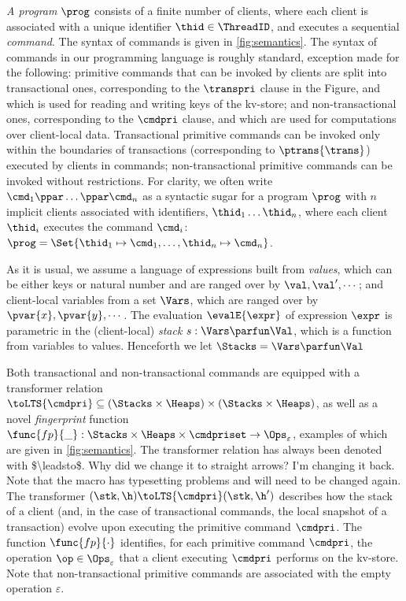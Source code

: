 \emph{A program} \( \prog \) consists of a finite number of clients, where each client is associated with a unique identifier \( \thid \in \ThreadID \), and executes a sequential \emph{command}. The syntax of commands is given in \cref{fig:semantics}. 
The syntax of commands in our programming language is roughly standard, exception made for the following: 
primitive commands that can be invoked by clients are split into transactional ones, corresponding to the $\transpri$ clause in the Figure, and which is used for reading 
and writing keys of the kv-store; and non-transactional ones, corresponding to the $\cmdpri$ clause, and which are used for computations over client-local data. 
Transactional primitive commands can be invoked only within the boundaries of transactions (corresponding to $\ptrans{\trans}$) executed by clients in commands;
non-transactional primitive commands can be invoked without restrictions.
For clarity, we often write \( \cmd_{1}\ppar \dots \ppar \cmd_{n}\) as a syntactic sugar for a program \( \prog \) with $n$ implicit clients associated with identifiers, $\thid_1 \dots \thid_n$, where each client $\thid_i$ executes the command $\cmd_i$:  \( \prog = \Set{\thid_{1} \mapsto \cmd_{1}, \dots, \thid_{n} \mapsto \cmd_{n}  }\).

As it is usual, we assume a language of expressions 
built from \emph{values}, which can be either keys or natural number and are ranged over by $\val, \val', \cdots$; 
and client-local variables from a set $\Vars$, which are ranged over by $\pvar{x}, \pvar{y}, \cdots$. The evaluation $\evalE{\expr}$ of  expression 
$\expr$  is parametric in the (client-local) \emph{stack} $s: \Vars \parfun \Val$, which is a function from variables to values. 
Henceforth we let $\Stacks = \Vars \parfun \Val$

Both transactional and non-transactional commands are equipped with a transformer relation $\toLTS{\cmdpri} \subseteq 
(\Stacks \times \Heaps) \times (\Stacks \times \Heaps)$, as well as a 
novel \emph{fingerprint} function $\func{fp}{\_} : \Stacks \times \Heaps \times \cmdpriset \rightarrow \Ops_{\varepsilon}$, 
examples of which are given in \cref{fig:semantics}. 
\ac{The transformer relation has always been denoted with $\leadsto$. Why did we change it to straight arrows? 
I'm changing it back. Note that the macro has typesetting problems and will need to be changed again.}
The transformer $(\stk, \h)  \toLTS{\cmdpri} (\stk, \h')$ describes how the stack of a client (and, in the case of transactional commands, 
the local snapshot of a transaction) evolve upon executing the primitive command $\cmdpri$.
The function $\func{fp}{\cdot}$ identifies, for each primitive command $\cmdpri$, the operation $\op \in \Ops_{\varepsilon}$
that a client executing $\cmdpri$  performs on the kv-store. Note that non-transactional primitive commands are associated with 
the empty operation $\varepsilon$. 

